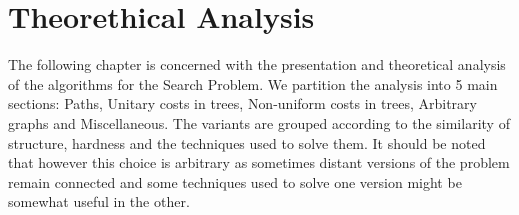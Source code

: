 \chapter{Theorethical Analysis}

The following chapter is concerned with the presentation and theoretical analysis of the algorithms for the Search Problem. We partition the analysis into 5 main sections: Paths, Unitary costs in trees, Non-uniform costs in trees, Arbitrary graphs and Miscellaneous. The variants are grouped according to the similarity of structure, hardness and the techniques used to solve them. It should be noted that however this choice is arbitrary as sometimes distant versions of the problem remain connected and some techniques used to solve one version might be somewhat useful in the other.






